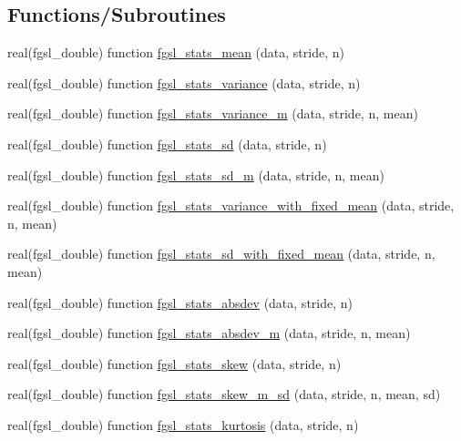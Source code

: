 \subsection*{Functions/\+Subroutines}
\begin{DoxyCompactItemize}
\item 
real(fgsl\+\_\+double) function \hyperlink{statistics_8finc_a13ad6bf10a4daeba24e77b90512a2e04}{fgsl\+\_\+stats\+\_\+mean} (data, stride, n)
\item 
real(fgsl\+\_\+double) function \hyperlink{statistics_8finc_abd5a6101ce9b7e8278e6b9843c92e121}{fgsl\+\_\+stats\+\_\+variance} (data, stride, n)
\item 
real(fgsl\+\_\+double) function \hyperlink{statistics_8finc_a82ebcf08a4a62d8acd2cd4516e655092}{fgsl\+\_\+stats\+\_\+variance\+\_\+m} (data, stride, n, mean)
\item 
real(fgsl\+\_\+double) function \hyperlink{statistics_8finc_ad6a8382d4b0eaf033302a684a19c48d7}{fgsl\+\_\+stats\+\_\+sd} (data, stride, n)
\item 
real(fgsl\+\_\+double) function \hyperlink{statistics_8finc_a2b705cc724e72bbfaab255052b08b4aa}{fgsl\+\_\+stats\+\_\+sd\+\_\+m} (data, stride, n, mean)
\item 
real(fgsl\+\_\+double) function \hyperlink{statistics_8finc_a6b816113373329675a28ef28d833fda2}{fgsl\+\_\+stats\+\_\+variance\+\_\+with\+\_\+fixed\+\_\+mean} (data, stride, n, mean)
\item 
real(fgsl\+\_\+double) function \hyperlink{statistics_8finc_a940f39032c1dcf2fc8ec83114169ded5}{fgsl\+\_\+stats\+\_\+sd\+\_\+with\+\_\+fixed\+\_\+mean} (data, stride, n, mean)
\item 
real(fgsl\+\_\+double) function \hyperlink{statistics_8finc_a63ca760a17cd6d3109ff5cfd2c0c0fc1}{fgsl\+\_\+stats\+\_\+absdev} (data, stride, n)
\item 
real(fgsl\+\_\+double) function \hyperlink{statistics_8finc_a776af1d0102b9c73f4839963012a066f}{fgsl\+\_\+stats\+\_\+absdev\+\_\+m} (data, stride, n, mean)
\item 
real(fgsl\+\_\+double) function \hyperlink{statistics_8finc_afa3dfb29e31d3a70b48eb755419ff252}{fgsl\+\_\+stats\+\_\+skew} (data, stride, n)
\item 
real(fgsl\+\_\+double) function \hyperlink{statistics_8finc_abe7a2765433ae6d8d5b01871079bc214}{fgsl\+\_\+stats\+\_\+skew\+\_\+m\+\_\+sd} (data, stride, n, mean, sd)
\item 
real(fgsl\+\_\+double) function \hyperlink{statistics_8finc_ab717a41e26eca4a329a3b1ba8ad49e36}{fgsl\+\_\+stats\+\_\+kurtosis} (data, stride, n)

\end{DoxyCompactItemize}
